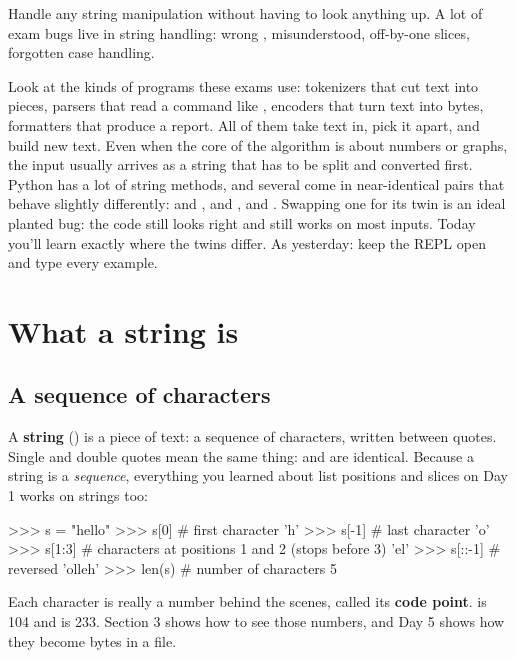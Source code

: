 \documentclass[10pt,a4paper]{article}
\begin{document}
\makecover
\setcounter{page}{2}
\makefrontmatter
\begin{goalbox}
Handle any string manipulation without having to look anything up. A lot of exam bugs live in string handling: wrong ,  misunderstood, off-by-one slices, forgotten case handling.
\end{goalbox}
\vspace{2pt}
Look at the kinds of programs these exams use: tokenizers that cut text into pieces, parsers that read a command like , encoders that turn text into bytes, formatters that produce a report. All of them take text in, pick it apart, and build new text. Even when the core of the algorithm is about numbers or graphs, the input usually arrives as a string that has to be split and converted first.
Python has a lot of string methods, and several come in near-identical pairs that behave slightly differently:  and ,  and ,  and . Swapping one for its twin is an ideal planted bug: the code still looks right and still works on most inputs. Today you’ll learn exactly where the twins differ.
As yesterday: keep the REPL open and type every example.
\setcounter{section}{0}
\section{What a string is}
\subsection{A sequence of characters}
A \textbf{string} () is a piece of text: a sequence of characters, written between quotes. Single and double quotes mean the same thing:  and  are identical.
Because a string is a \emph{sequence}, everything you learned about list positions and slices on Day 1 works on strings too:
\begin{txtcode}
>>> s = "hello"
>>> s[0]          # first character
'h'
>>> s[-1]         # last character
'o'
>>> s[1:3]        # characters at positions 1 and 2 (stops before 3)
'el'
>>> s[::-1]       # reversed
'olleh'
>>> len(s)        # number of characters
5
\end{txtcode}
Each character is really a number behind the scenes, called its \textbf{code point}.  is 104 and  is 233. Section 3 shows how to see those numbers, and Day 5 shows how they become bytes in a file.
\end{document}
